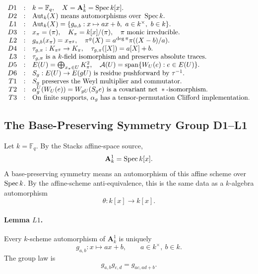 \[
\begin{array}{rcl}
D1&:&k=\mathbb F_q,\quad X=\mathbf A^1_k=\operatorname{Spec} k[x].\\
D2&:&\operatorname{Aut}_k(X)\text{ means automorphisms over }\operatorname{Spec} k.\\
L1&:&\operatorname{Aut}_k(X)=
      \{g_{a,b}:x\mapsto ax+b,\ a\in k^\times,\ b\in k\}.\\
D3&:&x_\pi=(\pi),\quad K_\pi=k[x]/(\pi),\quad
      \pi\text{ monic irreducible}.\\
L2&:&g_{a,b}(x_\pi)=x_{\pi^g},\quad
      \pi^g(X)=a^{\deg\pi}\pi((X-b)/a).\\
D4&:&\tau_{g,\pi}:K_{\pi^g}\to K_\pi,\quad
      \tau_{g,\pi}([X])=a[X]+b.\\
L3&:&\tau_{g,\pi}\text{ is a }k\text{-field isomorphism and preserves
      absolute traces.}\\
D5&:&E(U)=\bigoplus_{x_\pi\in U}K_\pi^2,\quad
      \mathcal A(U)=\operatorname{span}\{W_U(e):e\in E(U)\}.\\
D6&:&S_g:E(U)\to E(gU)\text{ is residue pushforward by }\tau^{-1}.\\
T1&:&S_g\text{ preserves the Weyl multiplier and commutator}.\\
T2&:&\alpha_g^U(W_U(e))=W_{gU}(S_g e)\text{ is a covariant net
      }*\text{-isomorphism}.\\
T3&:&\text{On finite supports, }\alpha_g\text{ has a tensor-permutation
      Clifford implementation.}
\end{array}
\]

\subsection{The Base-Preserving Symmetry Group D1--L1}

Let \(k=\mathbb F_q\).  By the Stacks affine-space source,
\[
  \mathbf A^1_k=\operatorname{Spec} k[x].
\]
A base-preserving symmetry means an automorphism of this affine scheme over
\(\operatorname{Spec} k\).  By the affine-scheme anti-equivalence, this is the same data as
a \(k\)-algebra automorphism
\[
  \theta:k[x]\longrightarrow k[x].
\]

\paragraph{Lemma \(L1\).}
Every \(k\)-scheme automorphism of \(\mathbf A^1_k\) is uniquely
\[
  g_{a,b}:x\longmapsto ax+b,
  \qquad a\in k^\times,\ b\in k.
\]
The group law is
\[
  g_{a,b}g_{c,d}=g_{ac,ad+b}.
\]

